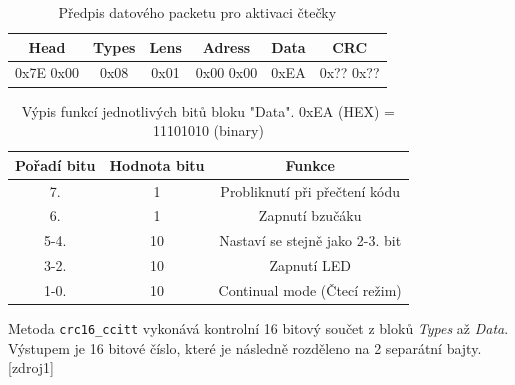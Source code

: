 \begin{table}[H]
    \centering
    \begin{tabular}{|c|c|c|c|c|c|}
         \hline
         Head & Types & Lens & Adress & Data & CRC\\ \hline
         0x7E 0x00 & 0x08 & 0x01 & 0x00 0x00 & 0xEA & 0x?? 0x??\\
         \hline
    \end{tabular}
    \caption{Předpis datového packetu pro aktivaci čtečky}
    \label{tab:my_label}
\end{table}

\begin{table}[H]
    \centering
    \begin{tabular}{|c|c|c|}
         \hline
         Pořadí bitu & Hodnota bitu & Funkce \\ \hline
         7. & 1 & Probliknutí při přečtení kódu \\ \hline
         6. & 1 & Zapnutí bzučáku \\ \hline
         5-4. & 10 & Nastaví se stejně jako 2-3. bit \\ \hline
         3-2. & 10 & Zapnutí LED \\ \hline
         1-0. & 10 & Continual mode (Čtecí režim)\\ \hline
    \end{tabular}
    \caption{Výpis funkcí jednotlivých bitů bloku "Data". 0xEA (HEX) = 11101010 (binary)}
    \label{tab:my_label}
\end{table}

%
%
%           
%
%        
\bigskip
Metoda \texttt{crc16\_ccitt} vykonává kontrolní 16 bitový součet z bloků \textit{Types} až \textit{Data}. Výstupem je 16 bitové číslo, které je následně rozděleno na 2 separátní bajty.[zdroj1]

